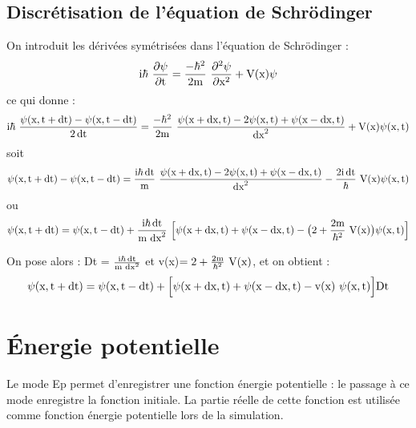 \subsection{Discrétisation de l'équation de Schrödinger}
%
On introduit les dérivées symétrisées dans l'équation de Schrödinger :
\[
\mt{i}\hbar\ \frac{\partial\psi}{\partial\mt{t}} =
\frac{-\hbar^2}{2\mt{m}}\ \frac{\partial^2\psi}{\partial\mt{x}^2}
+\mt{V(x)}\psi
\]
%
ce qui donne :
\[
\mt{i}\hbar\ \frac{\psi(\mt{x},\mt{t}+\dt)-\psi(\mt{x},\mt{t}-\dt)}{2\dt} =
\frac{-\hbar^2}{2\mt{m}}\ \frac{\psi(\mt{x}+\mt{dx},\mt{t})-2\psi(\mt{x},\mt{t})+\psi(\mt{x}-\mt{dx},\mt{t})}{\mt{dx}^2}
+\mt{V(x)}\psi(\mt{x},\mt{t})
\]
%
soit
\[
\psi(\mt{x},\mt{t}+\dt)-\psi(\mt{x},\mt{t}-\dt)=
\frac{\mt{i}\hbar\dt}{\mt{m}}\ \frac{\psi(\mt{x}+\mt{dx},\mt{t})-2\psi(\mt{x},\mt{t})+\psi(\mt{x}-\mt{dx},\mt{t})}{\mt{dx}^2}
-\frac{2\mt{i}\dt}{\hbar}\ \mt{V(x)}\psi(\mt{x},\mt{t})
\]
ou
\[
\psi(\mt{x},\mt{t}+\dt)=\psi(\mt{x},\mt{t}-\dt)+
\frac{\mt{i}\hbar\dt}{\mt{m }\mt{dx}^2}\ \Big[\psi(\mt{x}+\mt{dx},\mt{t})+\psi(\mt{x}-\mt{dx},\mt{t})
-\big(2+\frac{2\mt{m}}{\hbar^2}\ \mt{V(x)}\big)\psi(\mt{x},\mt{t})\Big]
\]

On pose alors : Dt = $\frac{\text{i}\hbar\operatorname{dt}}{\text{m }\text{dx}^2}$ et v(x)$=2+\frac{2\mt{m}}{\hbar^2}\ \mt{V(x)}$, et on obtient :
\[
\psi(\text{x},\text{t}+\operatorname{dt})=\psi(\text{x},\text{t}-\operatorname{dt})+
\Big[\psi(\text{x}+\text{dx},\text{t})+\psi(\text{x}-\text{dx},\text{t})
-\text{v(x) }\psi(\text{x},\text{t})\Big]\text{Dt}
\]



\section{Énergie potentielle} %
%
Le mode Ep permet d'enregistrer une fonction énergie potentielle : le passage à ce mode enregistre la fonction initiale. La partie réelle de cette fonction est utilisée comme fonction énergie potentielle lors de la simulation.
%

